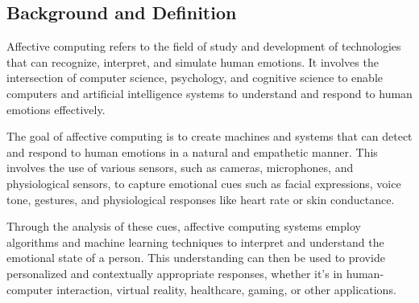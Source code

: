 \subsection{Background and Definition}
Affective computing refers to the field of study and development of technologies that can recognize, interpret, and simulate human emotions.
It involves the intersection of computer science, psychology, 
and cognitive science to enable computers and artificial intelligence systems to understand and respond to human emotions effectively.

The goal of affective computing is to create machines and systems that can detect and respond to human emotions in a natural and empathetic manner. 
This involves the use of various sensors, such as cameras, microphones, and physiological sensors, to capture emotional cues such as facial expressions, 
voice tone, gestures, and physiological responses like heart rate or skin conductance.

Through the analysis of these cues, affective computing systems employ algorithms and machine learning techniques to interpret and understand the emotional state of a person. 
This understanding can then be used to provide personalized and contextually appropriate responses, whether it's in human-computer interaction, 
virtual reality, healthcare, gaming, or other applications.